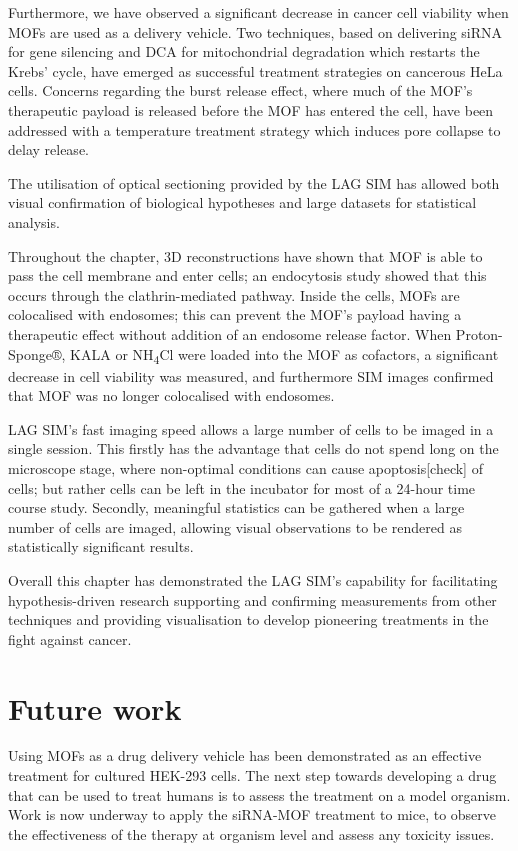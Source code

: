 Furthermore, we have observed a significant decrease in cancer cell viability when MOFs are used as a delivery vehicle. 
Two techniques, based on delivering siRNA for gene silencing and DCA for mitochondrial degradation which restarts the Krebs' cycle, have emerged as successful treatment strategies on cancerous HeLa cells. 
Concerns regarding the burst release effect, where much of the MOF's therapeutic payload is released before the MOF has entered the cell, have been addressed with a temperature treatment strategy which induces pore collapse to delay release. 

The utilisation of optical sectioning provided by the LAG SIM has allowed both visual confirmation of biological hypotheses and large datasets for statistical analysis. 

Throughout the chapter, 3D reconstructions have shown that MOF is able to pass the cell membrane and enter cells; an endocytosis study showed that this occurs through the clathrin-mediated pathway. 
Inside the cells, MOFs are colocalised with endosomes; this can prevent the MOF's payload having a therapeutic effect without addition of an endosome release factor. 
When Proton-Sponge®, KALA or NH\textsubscript{4}Cl were loaded into the MOF as cofactors, a significant decrease in cell viability was measured, and furthermore SIM images confirmed that MOF was no longer colocalised with endosomes. 

LAG SIM's fast imaging speed allows a large number of cells to be imaged in a single session. 
This firstly has the advantage that cells do not spend long on the microscope stage, where non-optimal conditions can cause apoptosis[check] of cells; but rather cells can be left in the incubator for most of a 24-hour time course study. 
Secondly, meaningful statistics can be gathered when a large number of cells are imaged, allowing visual observations to be rendered as statistically significant results.

Overall this chapter has demonstrated the LAG SIM's capability for facilitating hypothesis-driven research supporting and confirming measurements from other techniques and providing visualisation to develop pioneering treatments in the fight against cancer. 

\section{Future work}
Using MOFs as a drug delivery vehicle has been demonstrated as an effective treatment for cultured HEK-293 cells. 
The next step towards developing a drug that can be used to treat humans is to assess the treatment on a model organism. 
Work is now underway to apply the siRNA-MOF treatment to mice, to observe the effectiveness of the therapy at organism level and assess any toxicity issues. 

